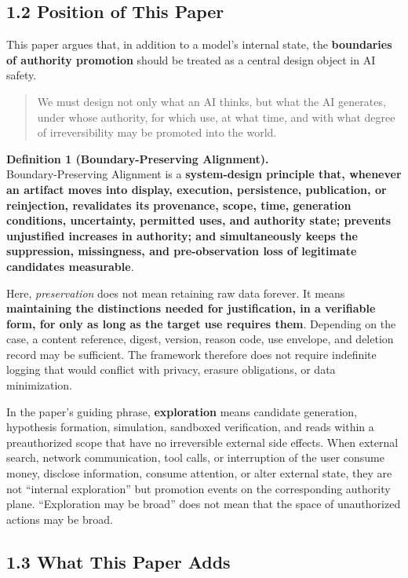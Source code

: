\subsection{1.2 Position of This Paper}\label{position-of-this-paper}

This paper argues that, in addition to a model's internal state, the \textbf{boundaries of authority promotion} should be treated as a central design object in AI safety.

\begin{quote}
We must design not only what an AI thinks, but what the AI generates, under whose authority, for which use, at what time, and with what degree of irreversibility may be promoted into the world.
\end{quote}

\textbf{Definition 1 (Boundary-Preserving Alignment).}\\
Boundary-Preserving Alignment is a \textbf{system-design principle that, whenever an artifact moves into display, execution, persistence, publication, or reinjection, revalidates its provenance, scope, time, generation conditions, uncertainty, permitted uses, and authority state; prevents unjustified increases in authority; and simultaneously keeps the suppression, missingness, and pre-observation loss of legitimate candidates measurable}.

Here, \emph{preservation} does not mean retaining raw data forever. It means \textbf{maintaining the distinctions needed for justification, in a verifiable form, for only as long as the target use requires them}. Depending on the case, a content reference, digest, version, reason code, use envelope, and deletion record may be sufficient. The framework therefore does not require indefinite logging that would conflict with privacy, erasure obligations, or data minimization.

In the paper's guiding phrase, \textbf{exploration} means candidate generation, hypothesis formation, simulation, sandboxed verification, and reads within a preauthorized scope that have no irreversible external side effects. When external search, network communication, tool calls, or interruption of the user consume money, disclose information, consume attention, or alter external state, they are not ``internal exploration'' but promotion events on the corresponding authority plane. ``Exploration may be broad'' does not mean that the space of unauthorized actions may be broad.

\subsection{1.3 What This Paper Adds}\label{what-this-paper-adds}

